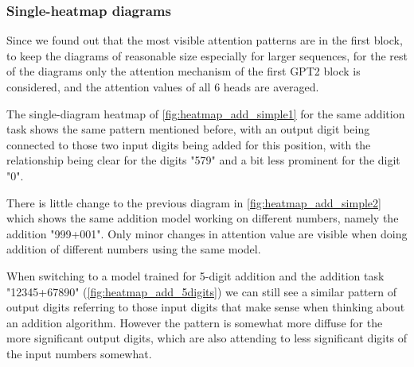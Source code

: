 \subsubsection{Single-heatmap diagrams}

Since we found out that the most visible attention patterns are in the first block, to keep the diagrams of reasonable size especially for larger sequences, for the rest of the diagrams only the attention mechanism of the first GPT2 block is considered, and the attention values of all 6 heads are averaged.


The single-diagram heatmap of \cref{fig:heatmap_add_simple1} for the same addition task shows the same pattern mentioned before, with an output digit being connected to those two input digits being added for this position, with the relationship being clear for the digits "579" and a bit less prominent for the digit "0".


There is little change to the previous diagram in \cref{fig:heatmap_add_simple2} which shows the same addition model working on different numbers, namely the addition "999+001". Only minor changes in attention value are visible when doing addition of different numbers using the same model.


When switching to a model trained for 5-digit addition and the addition task "12345+67890" (\cref{fig:heatmap_add_5digits}) we can still see a similar pattern of output digits referring to those input digits that make sense when thinking about an addition algorithm. However the pattern is somewhat more diffuse for the more significant output digits, which are also attending to less significant digits of the input numbers somewhat.


